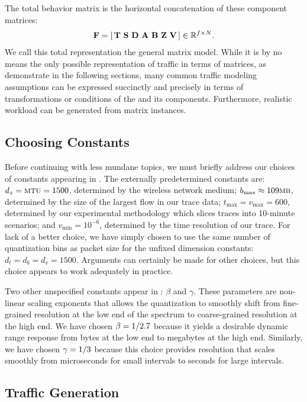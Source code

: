 \documentclass[twocolumn,final]{svjour3}
\begin{document}
The total behavior matrix is the horizontal concatenation of these component matrices:
\begin{align}
\mathbf{F} = \left[\,\mathbf{T}~\mathbf{S}~\mathbf{D}~\mathbf{A}~\mathbf{B}~\mathbf{Z}~\mathbf{V}\,\right] \in \mathbb{R}^{f \times N}.
\end{align}
We call this total representation the general matrix model.
While it is by no means the only possible representation of traffic in terms of matrices, as demonstrate in the following sections, many common traffic modeling assumptions can be expressed succinctly and precisely in terms of transformations or conditions of the  and its components.
Furthermore, realistic workload can be generated from matrix instances.

\subsection{Choosing Constants}

Before continuing with less mundane topics, we must briefly address our choices of constants appearing in .
The externally predetermined constants are:
$d_z=\text{\caps{MTU}}=1500$, determined by the wireless network medium;
$b_{\max} \approx 109 \text{\caps{MB}}$, determined by the size of the largest flow in our trace data;
$t_{\max}=v_{\max}=600$, determined by our experimental methodology which slices traces into 10-minute scenarios;
and $v_{\min}=10^{-6}$, determined by the time resolution of our trace.
For lack of a better choice, we have simply chosen to use the same number of quantization bins as packet size for the unfixed dimension constants:
$d_t = d_b = d_v = 1500$.
Arguments can certainly be made for other choices, but this choice appears to work adequately in practice.

Two other unspecified constants appear in : $\beta$ and $\gamma$.
These parameters are non-linear scaling exponents that allows the quantization to smoothly shift from fine-grained resolution at the low end of the spectrum to coarse-grained resolution at the high end.
We have chosen $\beta={1/2.7}$ because it yields a desirable dynamic range response from bytes at the low end to megabytes at the high end.
Similarly, we have chosen $\gamma={1/3}$ because this choice provides resolution that scales smoothly from microseconds for small intervals to seconds for large intervals.

\subsection{Traffic Generation}
\end{document}
